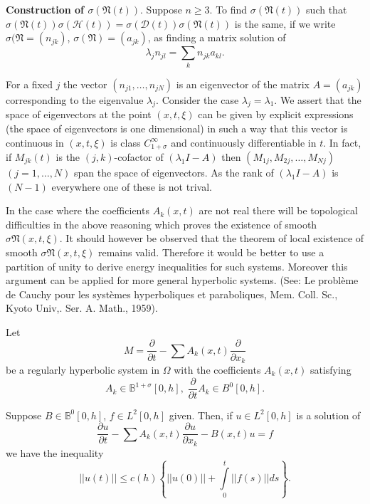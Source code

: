 \smallskip
\noindent
\textbf{Construction of $\sigma(\mathfrak{N}(t))$}. Suppose $n \geq
3$. To find $\sigma (\mathfrak{N}(t))$ such that $\sigma 
(\mathfrak{N}(t)) \sigma (\mathscr{H}(t)) =
\sigma(\mathscr{D}(t))\sigma (\mathfrak{N}(t))$ is the same, if we
write $\sigma (\mathfrak{N} = (n_{jk})$, $\sigma
(\mathfrak{N})=(a_{jk})$, as finding a matrix solution of 
$$
\lambda_j n_{jl} = \sum_k n_{jk}  a_{kl}.
$$

For a fixed $j$ the vector $(n_{j1},\ldots, n_{jN})$ is an eigenvector
of the matrix $A =(a_{jk})$ corresponding to the eigenvalue
$\lambda_j$. Consider the case $\lambda_j = \lambda_1$. We assert that
the space of eigenvectors at the point $(x, t, \xi)$ can be given by
explicit expressions (the space of eigenvectors is one dimensional) in
such a way that this vector is continuous in $(x, t, \xi)$ is class
$C^{\infty}_{1+\sigma}$ and continuously differentiable in $t$. In
fact, if $M_{jk}(t)$ is the $(j, k)$-cofactor of $(\lambda_1 I -A)$ then
$(M_{1j}, M_{2j},\ldots, M_{Nj})$ $(j = 1,\ldots, N)$\pageoriginale
span the space of eigenvectors. As the rank of $(\lambda_1I-A)$ is
$(N-1)$ everywhere one of these is not trival.  

\begin{remark*}%
In the case where the coefficients $A_k(x, t)$ are not real there will
be topological difficulties in the above reasoning which proves the
existence of smooth $\sigma \mathfrak{N}(x, t, \xi)$. It should however
be observed that the theorem of local existence of smooth $\sigma
\mathfrak{N} (x, t, \xi)$ remains valid. Therefore it would be better
to use a partition of unity to derive energy inequalities for such
systems. Moreover this argument can be applied for more general
hyperbolic systems. (See: Le probl\`eme de Cauchy pour les syst\`emes
hyperboliques et paraboliques, Mem. Coll. Sc., Kyoto
Univ,. Ser. A. Math., 1959). 
\end{remark*}

\begin{proposition}\label{chap3-sec6-prop2}%
Let 
$$
M = \frac{\partial}{\partial t} -  \sum A_k (x, t)
\frac{\partial}{\partial x_k} 
$$
be a regularly hyperbolic system in $\Omega$ with the coefficients
$A_k (x, t)$ satisfying  
$$
A_k \in \mathbb{B}^{1+ \sigma} [0, h],
\; \frac{\partial}{\partial t} A_k \in B^0 [0, h]. 
$$

Suppose $B \in \mathbb{B}^0 [0, h]$, $f \in L^2 [0, h]$
given. Then, if $u \in L^2 [0, h]$ is a solution of  
\begin{equation*}
\frac{\partial u}{\partial t} - \sum A_k (x, t) \frac{\partial
  u}{\partial x_k} - B(x, t) u = f \tag{6.5} \label{chap3-eq6.5}
\end{equation*}
we have the inequality 
\begin{equation*}
|| u (t) || \leq c(h) \left\{ || u (0) || + \int\limits^t_0 || f(s) || ds
\right\}. \tag{6.6} \label{chap3-eq6.6}
\end{equation*}
\end{proposition}

